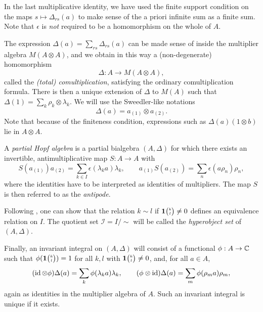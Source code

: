 In the last multiplicative identity, we have used the finite support condition on the maps $s\mapsto \Delta_{rs}(a)$ to make sense of the a priori infinite sum as a finite sum. Note that $\epsilon$ is \emph{not} required to be a homomorphism on the whole of $A$.

The expression $\Delta(a) = \sum_{rs}\Delta_{rs}(a)$ can be made sense of inside the multiplier algebra $M(A\otimes A)$, and we obtain in this way a (non-degenerate) homomorphism \[\Delta: A\rightarrow M(A\otimes A),\] called the \emph{(total) comultiplication}, satisfying the ordinary comultiplication formula. There is then a unique extension of $\Delta$ to $M(A)$ such that $\Delta(1) =\sum_k \rho_k\otimes \lambda_k$. We will use the Sweedler-like notations \[\Delta(a) = a_{(1)}\otimes a_{(2)}.\] Note that because of the finiteness condition, expressions such as $\Delta(a)(1\otimes b)$ lie in $A\otimes A$.


A \emph{partial Hopf algebra} \cite[Definition 1.7]{DCT1} is a partial bialgebra $(A,\Delta)$ for which there exists an invertible, antimultiplicative map $S: A\rightarrow A$ with \[S(a_{(1)})a_{(2)} = \sum_{k\in I} \epsilon(\lambda_ka)\lambda_k,\qquad a_{(1)}S(a_{(2)}) = \sum_n\epsilon(a\rho_n)\rho_n,\] where the identities have to be interpreted as identities of multipliers. The map $S$ is then referred to as the \emph{antipode}. 

Following \cite[Definition 1.8]{DCT1}, one can show that the relation $k\sim l$ if $\mathbf{1}{\tiny {\begin{pmatrix} k\\l\end{pmatrix}}}\neq0$ defines an equivalence relation on $I$. The quotient set $\mathscr{I} = I/\sim$ will be called the \emph{hyperobject set} of $(A,\Delta)$.

Finally, an invariant integral on $(A,\Delta)$ \cite[Definition 1.12]{DCT1} will consist of a functional $\phi: A\rightarrow \mathbb{C}$ such that $\phi(\mathbf{1}{\tiny {\begin{pmatrix} k\\l\end{pmatrix}}})=1$ for all $k,l$ with $\mathbf{1}{\tiny {\begin{pmatrix} k\\l\end{pmatrix}}}\neq 0$, and, for all $a\in A$, \[(\operatorname{id}\otimes \phi)\Delta(a) = \sum_{k} \phi(\lambda_k a)\lambda_k,\qquad (\phi\otimes \operatorname{id})\Delta(a) = \sum_m \phi(\rho_m a)\rho_m,\] again as identities in the multiplier algebra of $A$. Such an invariant integral is unique if it exists.

